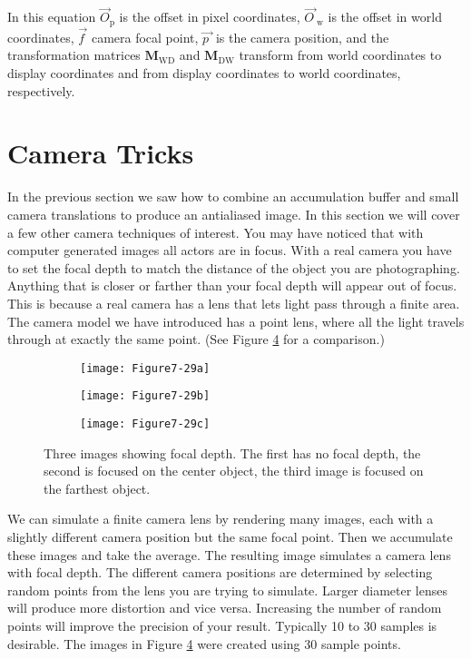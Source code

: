 In this equation $\overrightarrow{O}_\text{p}$ is the offset in pixel coordinates, $\overrightarrow{O\ }_\text{w}$ is the offset in world coordinates, $\overrightarrow{f\ }$ camera focal point, $\overrightarrow{p\ }$ is the camera position, and the transformation matrices $\textbf{M}_\text{WD}$ and  $\textbf{M}_\text{DW}$ transform from world coordinates to display coordinates and from display coordinates to world coordinates, respectively.

\section{Camera Tricks}

In the previous section we saw how to combine an accumulation buffer and small camera translations to produce an antialiased image. In this section we will cover a few other camera techniques of interest. You may have noticed that with computer generated images all actors are in focus. With a real camera you have to set the focal depth to match the distance of the object you are photographing. Anything that is closer or farther than your focal depth will appear out of focus. This is because a real camera has a lens that lets light pass through a finite area. The camera model we have introduced has a point lens, where all the light travels through at exactly the same point. (See Figure \ref{fig:Figure7-29} for a comparison.)

\begin{figure}[!htb]
	\centering
	\begin{subfigure}{0.32\linewidth}
		\centering
		\texttt{[image: Figure7-29a]}
		\caption*{}\label{fig:Figure7-29a}
	\end{subfigure}
	\hfill
	\begin{subfigure}{0.32\linewidth}
		\centering
		\texttt{[image: Figure7-29b]}
		\caption*{}\label{fig:Figure7-29b}
	\end{subfigure}%
	\hfill
	\begin{subfigure}{0.32\linewidth}
		\centering
		\texttt{[image: Figure7-29c]}
		\caption*{}\label{fig:Figure7-29c}
	\end{subfigure}%
	\caption{Three images showing focal depth. The first has no focal depth, the second is focused on the center object, the third image is focused on the farthest object.}
	\label{fig:Figure7-29}
\end{figure}

We can simulate a finite camera lens by rendering many images, each with a slightly different camera position but the same focal point. Then we accumulate these images and take the average. The resulting image simulates a camera lens with focal depth. The different camera positions are determined by selecting random points from the lens you are trying to simulate. Larger diameter lenses will produce more distortion and vice versa. Increasing the number of random points will improve the precision of your result. Typically 10 to 30 samples is desirable. The images in Figure \ref{fig:Figure7-29} were created using 30 sample points.


